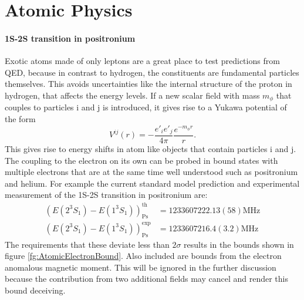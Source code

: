 \section{Atomic Physics}
\paragraph{1S-2S transition in positronium}
Exotic atoms made of only leptons are a great place to test predictions from QED, because in contrast to hydrogen, the constituents are fundamental particles themselves. This avoids uncertainties like the internal structure of the proton in hydrogen, that affects the energy levels. 
If a new scalar field with mass $m_\phi$ that couples to particles i and j is introduced, it gives rise to a Yukawa potential of the form \cite{Frugiuele:2019drl}
\begin{equation}
V^{ij}(r)= -\frac{e'_i e'_j}{4\pi}\frac{e^{-m_\phi r}}{r}.
\end{equation}
This gives rise to energy shifts in atom like objects that contain particles i and j. The coupling to the electron on its own can be probed in bound states with multiple electrons that are at the same time well understood such as positronium and helium. For example the current standard model prediction and experimental measurement of the 1S-2S transition in positronium are:
\begin{align}
(E(2^3S_1)-E(1^3S_1))_{\text{Ps}}^\text{th}&=1233607222.13(58)\text{MHz}\\
(E(2^3S_1)-E(1^3S_1))_{\text{Ps}}^\text{exp}&=1233607216.4(3.2) \text{MHz}
\end{align}
The requirements that these deviate less than $2\sigma$ results in the bounds shown in figure \ref{fg:AtomicElectronBound}. Also included are bounds from the electron anomalous magnetic moment. This will be ignored in the further discussion because the contribution from two additional fields may cancel and render this bound deceiving. 

